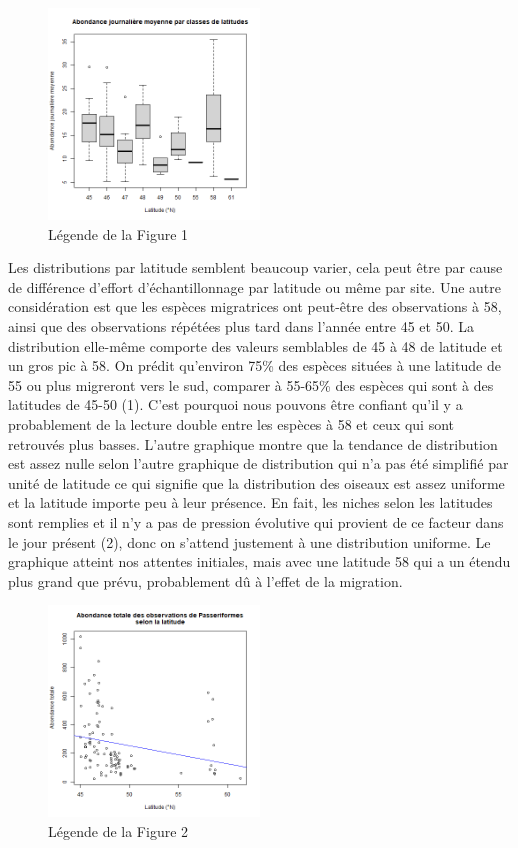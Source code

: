 \documentclass[9pt,twocolumn,twoside,]{pnas-new}
\begin{document}
\begin{figure}
\centering
\includegraphics[width=0.5\textwidth,height=0.4\textheight]{Figure2.png}
\caption{Légende de la Figure 1}
\end{figure}

Les distributions par latitude semblent beaucoup varier, cela peut être
par cause de différence d'effort d'échantillonnage par latitude ou même
par site. Une autre considération est que les espèces migratrices ont
peut-être des observations à 58, ainsi que des observations répétées
plus tard dans l'année entre 45 et 50. La distribution elle-même
comporte des valeurs semblables de 45 à 48 de latitude et un gros pic à
58. On prédit qu'environ 75\% des espèces situées à une latitude de 55
ou plus migreront vers le sud, comparer à 55-65\% des espèces qui sont à
des latitudes de 45-50 (1). C'est pourquoi nous pouvons être confiant
qu'il y a probablement de la lecture double entre les espèces à 58 et
ceux qui sont retrouvés plus basses. L'autre graphique montre que la
tendance de distribution est assez nulle selon l'autre graphique de
distribution qui n'a pas été simplifié par unité de latitude ce qui
signifie que la distribution des oiseaux est assez uniforme et la
latitude importe peu à leur présence. En fait, les niches selon les
latitudes sont remplies et il n'y a pas de pression évolutive qui
provient de ce facteur dans le jour présent (2), donc on s'attend
justement à une distribution uniforme. Le graphique atteint nos attentes
initiales, mais avec une latitude 58 qui a un étendu plus grand que
prévu, probablement dû à l'effet de la migration.

\begin{figure}
\centering
\includegraphics[width=0.5\textwidth,height=0.4\textheight]{Figure3.png}
\caption{Légende de la Figure 2}
\end{figure}
\end{document}
